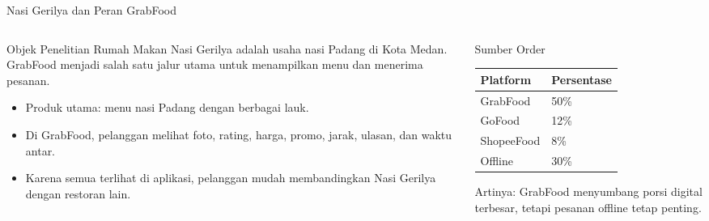 \documentclass[aspectratio=169,11pt]{beamer}
\begin{document}
\begin{frame}{Nasi Gerilya dan Peran GrabFood}
\small
\begin{columns}[T,onlytextwidth]
    \begin{column}{0.50\textwidth}
        \begin{block}{Objek Penelitian}
            Rumah Makan Nasi Gerilya adalah usaha nasi Padang di Kota Medan. GrabFood menjadi salah satu jalur utama untuk menampilkan menu dan menerima pesanan.
        \end{block}
        \begin{itemize}
            \item Produk utama: menu nasi Padang dengan berbagai lauk.
            \item Di GrabFood, pelanggan melihat foto, rating, harga, promo, jarak, ulasan, dan waktu antar.
            \item Karena semua terlihat di aplikasi, pelanggan mudah membandingkan Nasi Gerilya dengan restoran lain.
        \end{itemize}
    \end{column}
    \begin{column}{0.47\textwidth}
        \begin{block}{Sumber Order}
            \begin{tabularx}{\linewidth}{@{}Y C{1.5cm}@{}}
            \toprule
            \textbf{Platform} & \textbf{Persentase} \\
            \midrule
            GrabFood & 50\% \\
            GoFood & 12\% \\
            ShopeeFood & 8\% \\
            Offline & 30\% \\
            \bottomrule
            \end{tabularx}
        \end{block}
        \vspace{0.2cm}
        \alert{Artinya:} GrabFood menyumbang porsi digital terbesar, tetapi pesanan offline tetap penting.
    \end{column}
\end{columns}
\end{frame}
\end{document}
